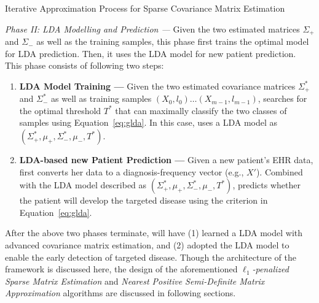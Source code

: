 \begin{algorithm}
\caption{Iterative Approximation Process for Sparse Covariance Matrix Estimation}
\label{alg:iap}
\end{algorithm}


\emph{Phase II: LDA Modelling and Prediction --- } Given the two estimated matrices $\Sigma_+$ and $\Sigma_-$ as well as the training samples, this phase first trains the optimal model for LDA prediction. 
Then, it uses the LDA model for new patient prediction. 
This phase consists of following two steps:
\begin{enumerate}
    \item \textbf{LDA Model Training --- } Given the two estimated covariance matrices $\Sigma_+^*$ and $\Sigma_-^*$ as well as training samples $(X_0,l_0)\dots (X_{m-1},l_{m-1})$, \TheName{} searches for the optimal threshold $T^*$ that can maximally classify the two classes of samples using Equation~\ref{eq:glda}. 
        In this case, \TheName{} uses a LDA model as $(\Sigma_+^*,\mu_+,\Sigma_-^*,\mu_-,T^*)$.
    \item \textbf{LDA-based new Patient Prediction --- } Given a new patient's EHR data, \TheName{} first converts her data to a diagnosis-frequency vector (e.g., $X'$). 
        Combined with the LDA model described as $(\Sigma_+^*,\mu_+,\Sigma_-^*,\mu_-,T^*)$, \TheName{} predicts whether the patient will develop the targeted disease using the criterion in Equation~\ref{eq:glda}.
\end{enumerate}
%

After the above two phases terminate, \TheName{} will have (1) learned a LDA model with advanced covariance matrix estimation, and (2)  adopted the LDA model to enable the early detection of targeted disease. 
Though the architecture of the framework is discussed here, the design of the aforementioned \emph{$\ell_1$-penalized Sparse Matrix Estimation} and \emph{Nearest Positive Semi-Definite Matrix Approximation} algorithms are discussed in following sections.

